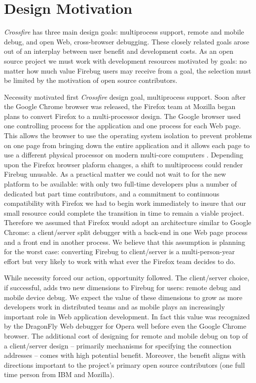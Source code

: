 \section{Design Motivation}
\textit{Crossfire} has three main design goals: multiprocess support, remote and
mobile debug, and open Web, cross-browser debugging.
These closely related goals arose out of an interplay between user benefit and development costs.
As an open source project we must work with development resources motivated by
goals: no matter how much value Firebug users may receive from a goal, the
selection must be limited by the motivation of open source contributors.

Necessity motivated first \textit{Crossfire} design goal, multiprocess support.
Soon after the Google Chrome browser was released, the Firefox team at Mozilla
began plans to convert Firefox to a multi-processor design.  The Google browser
used one controlling process for the application and one process for each Web
page.  This allows the browser to use the operating system isolation to prevent
problems on one page from bringing down the entire application and it allows
each page to use a different physical processor on modern multi-core computers
\cite{GoogleChrome}.  Depending upon the Firefox browser plaform changes, a
shift to multiprocess could render Firebug unusable. As a practical matter we
could not wait to for the new platform to be available: with only two full-time
developers plus a number of dedicated but part time contributors, and a commitment to continuous
compatibility with Firefox we had to begin work immediately to insure that our
small resource could complete the transition in time to remain a viable project.
Therefore we assumed that Firefox would adopt an architecture similar to Google
Chrome: a client/server split debugger with a back-end in one Web page process
and a front end in another process.  We believe that this assumption is planning
for the worst case: converting Firebug to client/server is a multi-person-year
effort but very likely to work with what ever the Firefox team decides to do.

While necessity forced our action, opportunity followed. The client/server
choice, if successful, adds two new dimensions to Firebug for users: remote
debug and mobile device debug. We expect the value of these dimensions to grow
as more developers work in distributed teams and as mobile plays an increasingly
important role in Web application development.  In fact this value was
recognized by the DragonFly Web debugger for Opera well before even the Google
Chrome browser.   The additional cost of designing for remote and mobile debug
on top of a client/server design -- primarily mechanisms for specifying the
connection addresses -- comes with high potential benefit.  Moreover, the benefit
aligns with directions important to the project's primary open source
contributors (one full time person from IBM and Mozilla).


